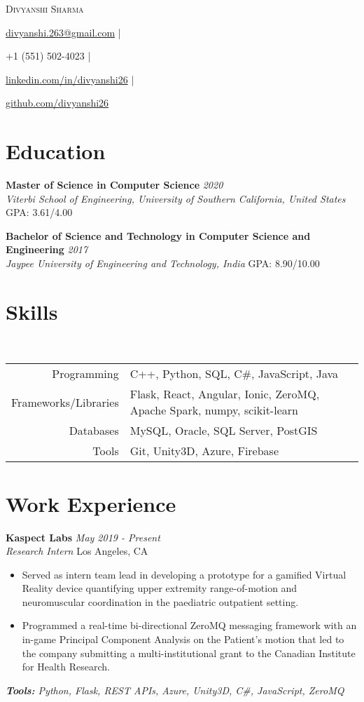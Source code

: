 \documentclass[letterpaper,10pt]{article}
\newcommand{\organization}[4]{
    \vspace{1.5pt}
    \textbf{#1} \hfill{\emph{#2}} \\
    \emph{#3} \hfill{#4} \\
    \vspace{3pt}
}
\newcommand{\toolsused}[1]{
    \vspace{1.5pt}
    \emph{#1}\\
    \vspace{3pt}
}
\newcommand{\skills}[4]{
    \vspace{-2pt}
    \ \ \ \ \ \ \ \ \ \ \ 
    \begin{tabular}{r!{\color{burgundy}\vrule}l}
          Programming & #1 \\
          Frameworks/Libraries & #2 \\
          Databases & #3 \\
          Tools & #4
    \end{tabular}
    \vspace{4pt}
}
\newcommand{\bulletsBegin}{
    \vspace{1pt}
    \begin{minipage}{17.6cm}
    \begin{itemize}[leftmargin=0.6cm]
    \setlength\itemsep{-0.1em}
}
\newcommand{\bulletsEnd}{
    \end{itemize}\vspace{0pt}
    \end{minipage}
}
\newcommand{\myEmail}[1]{
    \href{mailto:#1}{#1} |
}
\newcommand{\myPhone}[1]{
    {#1} |
}
\newcommand{\mySite}[1]{
    \href{https://linkedin.com/in/divyanshi26}{#1} |
}
\newcommand{\myGitHub}[1]{
    \href{https://github.com/divyanshi26}{#1}
}
\newcommand{\myName}[5]{
    \begin{center}
        {\huge{\color{burgundy}\scshape{#1}}} \\
        \vspace{6pt}
        \myEmail{#2}
        \myPhone{#3}
        \mySite{#4}
        \myGitHub{#5}
    \end{center}
    \vspace{-4pt}
}
\begin{document}
    \myName{Divyanshi Sharma}{divyanshi.263@gmail.com}{+1 (551) 502-4023}{linkedin.com/in/divyanshi26}{github.com/divyanshi26}

    \section{Education}
        
    \organization{Master of Science in Computer Science}{2020}
        {Viterbi School of Engineering, University of Southern California, United States}{GPA: 3.61/4.00}

	\organization{Bachelor of Science and Technology in Computer Science and Engineering}{2017}
        {Jaypee University of Engineering and Technology, India}{GPA: 8.90/10.00}
	\vspace{6pt}
    
    \section{Skills}
    
    \skills
        {C++, Python, SQL, C\#, JavaScript, Java}  %
        {Flask, React, Angular, Ionic, ZeroMQ, Apache Spark, numpy, scikit-learn}  %
        {MySQL, Oracle, SQL Server, PostGIS}  %
        {Git, Unity3D, Azure, Firebase}  %

    \section{Work Experience}

        \organization{Kaspect Labs}{May 2019 - Present}
        {Research Intern}{Los Angeles, CA}
        \bulletsBegin
            \item Served as intern team lead in developing a prototype for a gamified Virtual Reality device quantifying upper extremity range-of-motion and neuromuscular coordination in the paediatric outpatient setting.
            \item Programmed a real-time bi-directional ZeroMQ messaging framework with an in-game Principal Component Analysis on the Patient’s motion that led to the company submitting a multi-institutional grant to the Canadian Institute for Health Research.
            \vspace{-2pt}
        \bulletsEnd
        \vspace{-4pt}
        \toolsused{\textbf{Tools:} Python, Flask, REST APIs, Azure, Unity3D, C\#, JavaScript, ZeroMQ}
        
\end{document}
